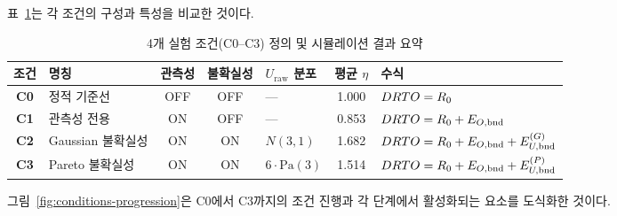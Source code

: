 \p{[}표~\ref{tab:conditions}\p{]}는 각 조건의 구성과 특성을 비교한 것이다.

\begin{table}[htbp]
\centering
\caption{4개 실험 조건(C0--C3) 정의 및 시뮬레이션 결과 요약}
\label{tab:conditions}
\small
\begin{tabularx}{\textwidth}{c l c c l c X}
\toprule
\textbf{조건} & \textbf{명칭} & \textbf{관측성} & \textbf{불확실성}
  & \textbf{$U_{\text{raw}}$ 분포} & \textbf{평균 $\eta$} & \textbf{수식} \\
\midrule
\textbf{C0} & 정적 기준선 & OFF & OFF & --- & 1.000 &
  $DRTO = R_0$ \\
\textbf{C1} & 관측성 전용 & ON & OFF & --- & 0.853 &
  $DRTO = R_0 + E_{O,\text{bnd}}$ \\
\textbf{C2} & Gaussian 불확실성 & ON & ON & $N(3, 1)$ & 1.682 &
  $DRTO = R_0 + E_{O,\text{bnd}} + E_{U,\text{bnd}}^{(G)}$ \\
\textbf{C3} & Pareto 불확실성 & ON & ON & $6 \cdot \mathrm{Pa}(3)$ & 1.514 &
  $DRTO = R_0 + E_{O,\text{bnd}} + E_{U,\text{bnd}}^{(P)}$ \\
\bottomrule
\end{tabularx}
\end{table}


\p{[}그림~\ref{fig:conditions-progression}\p{]}은 C0에서 C3까지의 조건 진행과
각 단계에서 활성화되는 요소를 도식화한 것이다.


